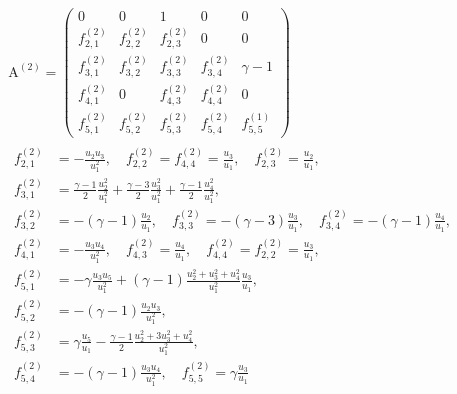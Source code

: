 \documentclass{turgon}
\begin{document}
\begin{gather}
  \begin{gathered}
    \mathrm{A}^{(2)} = \left(
    \begin{array}{ccccc}
      0             & 0             & 1             & 0             & 0 \\
      f^{(2)}_{2,1} & f^{(2)}_{2,2} & f^{(2)}_{2,3} & 0             & 0 \\
      f^{(2)}_{3,1} & f^{(2)}_{3,2} & f^{(2)}_{3,3} & f^{(2)}_{3,4} &
      \gamma - 1 \\
      f^{(2)}_{4,1} & 0             & f^{(2)}_{4,3} & f^{(2)}_{4,4} & 0 \\
      f^{(2)}_{5,1} & f^{(2)}_{5,2} & f^{(2)}_{5,3} & f^{(2)}_{5,4} &
      f^{(1)}_{5,5}
    \end{array}
    \right)
    \\
    \begin{aligned}
      f^{(2)}_{2,1} &= -\frac{u_2 u_3}{u_1^2}, \quad
      f^{(2)}_{2,2} = f^{(2)}_{4,4} = \frac{u_3}{u_1}, \quad
      f^{(2)}_{2,3} = \frac{u_2}{u_1}, \\
      f^{(2)}_{3,1} &= \frac{\gamma-1}{2}\frac{u_2^2}{u_1^2}
      + \frac{\gamma-3}{2}\frac{u_3^2}{u_1^2}
      + \frac{\gamma-1}{2}\frac{u_4^2}{u_1^2}, \\
      f^{(2)}_{3,2} &= -(\gamma-1)\frac{u_2}{u_1}, \quad
      f^{(2)}_{3,3} = -(\gamma-3)\frac{u_3}{u_1}, \quad
      f^{(2)}_{3,4} = -(\gamma-1)\frac{u_4}{u_1}, \\
      f^{(2)}_{4,1} &= -\frac{u_3 u_4}{u_1^2}, \quad
      f^{(2)}_{4,3} = \frac{u_4}{u_1}, \quad
      f^{(2)}_{4,4} = f^{(2)}_{2,2} = \frac{u_3}{u_1}, \\
      f^{(2)}_{5,1} &= -\gamma\frac{u_3 u_5}{u_1^2}
      + (\gamma-1)\frac{u_2^2+u_3^2+u_4^2}{u_1^2}\frac{u_3}{u_1}, \\
      f^{(2)}_{5,2} &= -(\gamma-1)\frac{u_2 u_3}{u_1^2}, \\
      f^{(2)}_{5,3} &= \gamma\frac{u_5}{u_1}
      - \frac{\gamma-1}{2}\frac{u_2^2 + 3u_3^2 + u_4^2}{u_1^2}, \\
      f^{(2)}_{5,4} &= -(\gamma-1)\frac{u_3 u_4}{u_1^2}, \quad
      f^{(2)}_{5,5} = \gamma\frac{u_3}{u_1}
    \end{aligned}
  \end{gathered}
  \label{e:euler:jaco1}
\end{gather}
%
\end{document}
